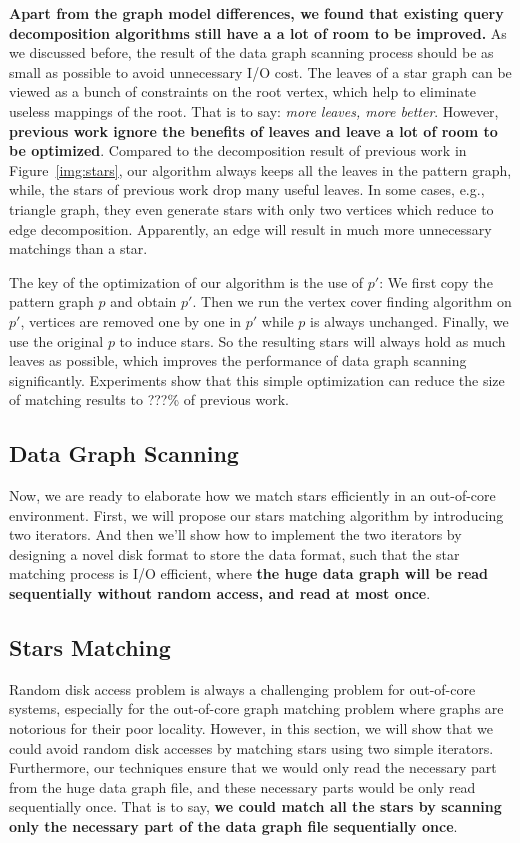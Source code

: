 \textbf{Apart from the graph model differences, we found that existing query decomposition algorithms still have a a lot of room to be improved.}
As we discussed before, the result of the data graph scanning process should be as small as possible to avoid unnecessary I/O cost.
The leaves of a star graph can be viewed as a bunch of constraints on the root vertex,
which help to eliminate useless mappings of the root.
That is to say: \emph{more leaves, more better}.
However, \textbf{previous work ignore the benefits of leaves and leave a lot of room to be optimized}.
Compared to the decomposition result of previous work in Figure~\ref{img:stars},
our algorithm always keeps all the leaves in the pattern graph,
while, the stars of previous work drop many useful leaves.
In some cases, e.g., triangle graph, they even generate stars with only two vertices which reduce to edge decomposition.
Apparently, an edge will result in much more unnecessary matchings than a star.

The key of the optimization of our algorithm is the use of $p'$:
We first copy the pattern graph $p$ and obtain $p'$.
Then we run the vertex cover finding algorithm on $p'$,
vertices are removed one by one in $p'$ while $p$ is always unchanged.
Finally, we use the original $p$ to induce stars.
So the resulting stars will always hold as much leaves as possible,
which improves the performance of data graph scanning significantly.
Experiments show that this simple optimization can reduce the size of matching results to \@???\% of previous work.
\subsection{Data Graph Scanning}\label{sec:data_graph_scanning}
Now, we are ready to elaborate how we match stars efficiently in an out-of-core environment.
First, we will propose our stars matching algorithm by introducing two iterators.
And then we'll show how to implement the two iterators by designing a novel disk format to store the data format,
such that the star matching process is I/O efficient, where \textbf{the huge data graph will be read sequentially without random access, and read at most once}.
\subsection*{Stars Matching}
Random disk access problem is always a challenging problem for out-of-core systems,
especially for the out-of-core graph matching problem where graphs are notorious for their poor locality.
However, in this section, we will show that we could avoid random disk accesses by matching stars using two simple iterators.
Furthermore, our techniques ensure that we would only read the necessary part from the huge data graph file,
and these necessary parts would be only read sequentially once.
That is to say, \textbf{we could match all the stars by scanning only the necessary part of the data graph file sequentially once}.

